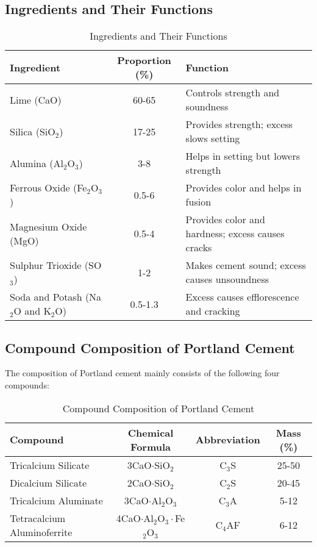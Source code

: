 \documentclass[a4paper,11pt]{book}
\begin{document}
\subsection*{Ingredients and Their Functions}
\begin{table}[h!]
\centering
\begin{tabular}{|l|c|p{8cm}|}
    \hline
    \textbf{Ingredient} & \textbf{Proportion (\%)} & \textbf{Function} \\
    \hline
    Lime (CaO) & 60-65 & Controls strength and soundness \\
    \hline
    Silica (SiO$_2$) & 17-25 & Provides strength; excess slows setting \\
    \hline
    Alumina (Al$_2$O$_3$) & 3-8 & Helps in setting but lowers strength \\
    \hline
    Ferrous Oxide (Fe$_2$O$_3$) & 0.5-6 & Provides color and helps in fusion \\
    \hline
    Magnesium Oxide (MgO) & 0.5-4 & Provides color and hardness; excess causes cracks \\
        \hline
    Sulphur Trioxide (SO$_3$) & 1-2 & Makes cement sound; excess causes unsoundness \\
    \hline
    Soda and Potash (Na$_2$O and K$_2$O) & 0.5-1.3 & Excess causes efflorescence and cracking \\
    \hline
\end{tabular}
\caption{Ingredients and Their Functions}
\end{table}

\subsection*{Compound Composition of Portland Cement}
The composition of Portland cement mainly consists of the following four compounds:
\begin{table}[h!]
\centering
\begin{tabular}{|l|c|c|c|}
    \hline
    \textbf{Compound} & \textbf{Chemical Formula} & \textbf{Abbreviation} & \textbf{Mass (\%)} \\
    \hline
    Tricalcium Silicate & 3CaO$\cdot$SiO$_2$ & C$_3$S & 25-50 \\
    \hline
    Dicalcium Silicate & 2CaO$\cdot$SiO$_2$ & C$_2$S & 20-45 \\
    \hline
    Tricalcium Aluminate & 3CaO$\cdot$Al$_2$O$_3$ & C$_3$A & 5-12 \\
    \hline
    Tetracalcium Aluminoferrite & 4CaO$\cdot$Al$_2$O$_3\cdot$Fe$_2$O$_3$ & C$_4$AF & 6-12 \\
    \hline
\end{tabular}
\caption{Compound Composition of Portland Cement}
\end{table}
\end{document}
